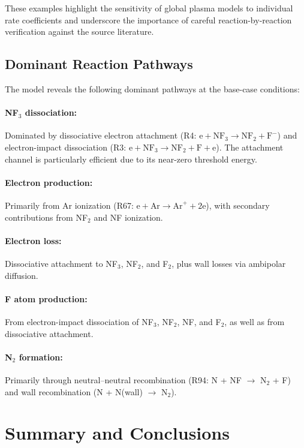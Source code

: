 \documentclass[11pt,a4paper]{article}
\newcommand{\species}[1]{\ensuremath{\mathrm{#1}}}
\newcommand{\ee}{\species{e}}
\begin{document}
These examples highlight the sensitivity of global plasma models to individual
rate coefficients and underscore the importance of careful reaction-by-reaction
verification against the source literature.


\subsection{Dominant Reaction Pathways}

The model reveals the following dominant pathways at the base-case conditions:

\paragraph{NF$_3$ dissociation:} Dominated by dissociative electron attachment
(R4: $\ee + \text{NF}_3 \to \text{NF}_2 + \text{F}^-$) and electron-impact
dissociation (R3: $\ee + \text{NF}_3 \to \text{NF}_2 + \text{F} + \ee$). The
attachment channel is particularly efficient due to its near-zero threshold
energy.

\paragraph{Electron production:} Primarily from Ar ionization (R67: $\ee +
\text{Ar} \to \text{Ar}^+ + 2\ee$), with secondary contributions from NF$_2$
and NF ionization.

\paragraph{Electron loss:} Dissociative attachment to NF$_3$, NF$_2$, and F$_2$,
plus wall losses via ambipolar diffusion.

\paragraph{F atom production:} From electron-impact dissociation of NF$_3$,
NF$_2$, NF, and F$_2$, as well as from dissociative attachment.

\paragraph{N$_2$ formation:} Primarily through neutral--neutral recombination
(R94: N + NF $\to$ N$_2$ + F) and wall recombination (N + N(wall) $\to$
N$_2$).


\section{Summary and Conclusions}
\label{sec:conclusions}
\end{document}
